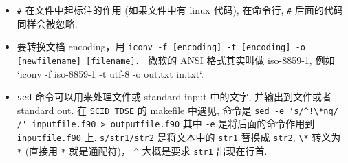 \begin{itemize}
\item \verb`#` 在文件中起标注的作用 (如果文件中有 linux 代码), 在命令行, \verb`#` 后面的代码同样会被忽略.
\item 要转换文档 encoding，用 \verb|iconv -f [encoding] -t [encoding] -o [newfilename] [filename]|． 微软的 ANSI 格式其实叫做 iso-8859-1, 例如 `iconv -f iso-8859-1 -t utf-8 -o out.txt in.txt`.
\item \verb`sed` 命令可以用来处理文件或 standard input 中的文字, 并输出到文件或者 standard out. 在 \verb`SCID_TDSE` 的 makefile 中遇见, 命令是
\verb|sed -e 's/^!\*nq/    /' inputfile.f90 > outputfile.f90|
其中 \verb`-e` 是将后面的命令作用到 \verb`inputfile.f90` 上. \verb`s/str1/str2` 是将文本中的 \verb`str1` 替换成 \verb`str2`, \verb`\*` 转义为 \verb`*` (直接用 \verb`*` 就是通配符)， \verb`^` 大概是要求 \verb`str1` 出现在行首.
\end{itemize}

